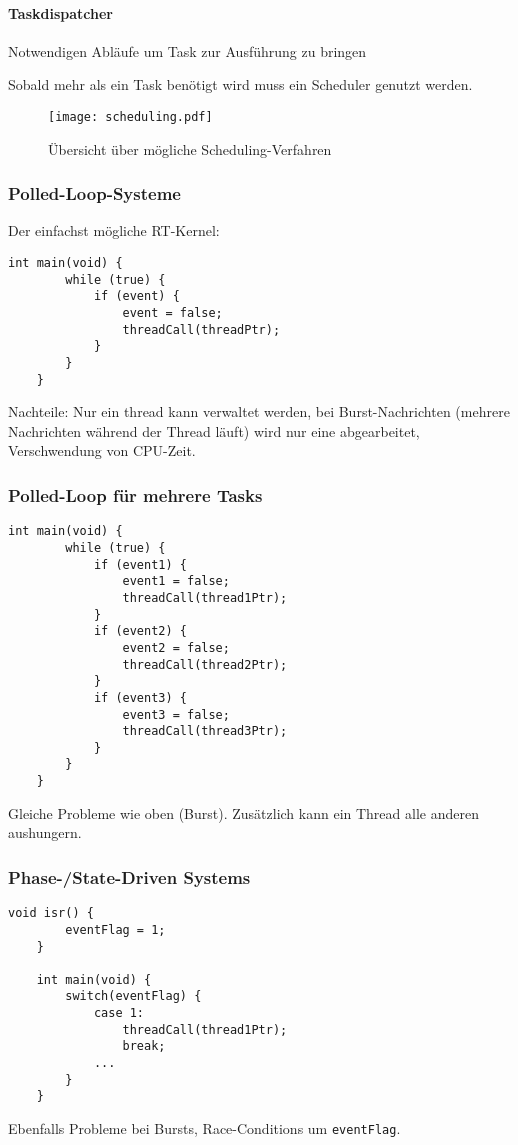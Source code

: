 \paragraph{Taskdispatcher} Notwendigen Abläufe um Task zur Ausführung zu bringen

Sobald mehr als ein Task benötigt wird muss ein Scheduler genutzt werden.
\begin{figure}[H]
    \centering
    \texttt{[image: scheduling.pdf]}
    \caption{Übersicht über mögliche Scheduling-Verfahren}
\end{figure}

\subsubsection{Polled-Loop-Systeme}
Der einfachst mögliche RT-Kernel:
\begin{lstlisting}[style=c]
    int main(void) {
        while (true) {
            if (event) {
                event = false;
                threadCall(threadPtr);
            }
        }
    }
\end{lstlisting}
Nachteile: Nur ein thread kann verwaltet werden, bei Burst-Nachrichten (mehrere Nachrichten während der Thread läuft) wird nur eine abgearbeitet, Verschwendung von CPU-Zeit.

\subsubsection{Polled-Loop für mehrere Tasks}
\begin{lstlisting}[style=c]
    int main(void) {
        while (true) {
            if (event1) {
                event1 = false;
                threadCall(thread1Ptr);
            }
            if (event2) {
                event2 = false;
                threadCall(thread2Ptr);
            }
            if (event3) {
                event3 = false;
                threadCall(thread3Ptr);
            }
        }
    }
\end{lstlisting}
Gleiche Probleme wie oben (Burst). Zusätzlich kann ein Thread alle anderen aushungern.

\subsubsection{Phase-/State-Driven Systems}
\begin{lstlisting}[style=c]
    void isr() {
        eventFlag = 1;
    }

    int main(void) {
        switch(eventFlag) {
            case 1:
                threadCall(thread1Ptr);
                break;
            ...
        }
    }
\end{lstlisting}
Ebenfalls Probleme bei Bursts, Race-Conditions um \lstinline[style=c]{eventFlag}.
